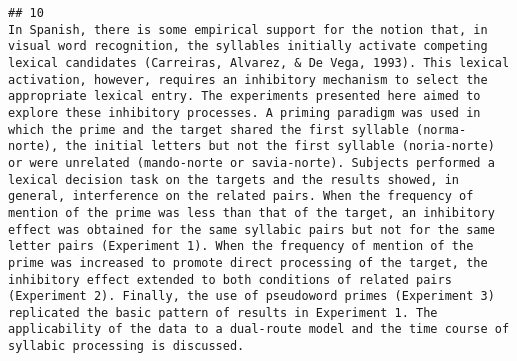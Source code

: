 \documentclass[
  english,
  man]{apa6}
\begin{document}
\begin{verbatim}
## 10                                                                                                                                                                                                                                                                                                                                                                                                                                                                                                                                                                                                                                                                                                                                                                                                                                                                                                                                                                                                                                                                                                                                                                                                                                                                                                            In Spanish, there is some empirical support for the notion that, in visual word recognition, the syllables initially activate competing lexical candidates (Carreiras, Alvarez, & De Vega, 1993). This lexical activation, however, requires an inhibitory mechanism to select the appropriate lexical entry. The experiments presented here aimed to explore these inhibitory processes. A priming paradigm was used in which the prime and the target shared the first syllable (norma-norte), the initial letters but not the first syllable (noria-norte) or were unrelated (mando-norte or savia-norte). Subjects performed a lexical decision task on the targets and the results showed, in general, interference on the related pairs. When the frequency of mention of the prime was less than that of the target, an inhibitory effect was obtained for the same syllabic pairs but not for the same letter pairs (Experiment 1). When the frequency of mention of the prime was increased to promote direct processing of the target, the inhibitory effect extended to both conditions of related pairs (Experiment 2). Finally, the use of pseudoword primes (Experiment 3) replicated the basic pattern of results in Experiment 1. The applicability of the data to a dual-route model and the time course of syllabic processing is discussed.

\end{verbatim}
\end{document}
